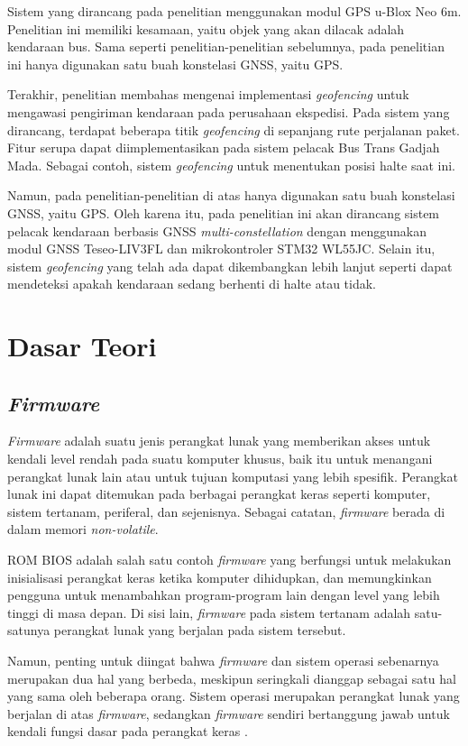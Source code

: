Sistem yang dirancang pada penelitian \cite{Widya2016} menggunakan modul GPS u-Blox Neo 6m. Penelitian ini memiliki kesamaan, yaitu objek yang akan dilacak adalah kendaraan bus. Sama seperti penelitian-penelitian sebelumnya, pada penelitian ini hanya digunakan satu buah konstelasi GNSS, yaitu GPS.

Terakhir, penelitian \cite{Priono2017} membahas mengenai implementasi \textit{geofencing} untuk mengawasi pengiriman kendaraan pada perusahaan ekspedisi. Pada sistem yang dirancang, terdapat beberapa titik \textit{geofencing} di sepanjang rute perjalanan paket. Fitur serupa dapat diimplementasikan pada sistem pelacak Bus Trans Gadjah Mada. Sebagai contoh, sistem \textit{geofencing} untuk menentukan posisi halte saat ini.

Namun, pada penelitian-penelitian di atas hanya digunakan satu buah konstelasi GNSS, yaitu GPS. Oleh karena itu, pada penelitian ini akan dirancang sistem pelacak kendaraan berbasis GNSS \textit{multi-constellation} dengan menggunakan modul GNSS Teseo-LIV3FL dan mikrokontroler STM32 WL55JC. Selain itu, sistem \textit{geofencing} yang telah ada dapat dikembangkan lebih lanjut seperti dapat mendeteksi apakah kendaraan sedang berhenti di halte atau tidak.

\section{Dasar Teori}
\subsection{\textit{Firmware}}
\textit{Firmware} adalah suatu jenis perangkat lunak yang memberikan akses untuk kendali level rendah pada suatu komputer khusus, baik itu untuk menangani perangkat lunak lain atau untuk tujuan komputasi yang lebih spesifik. Perangkat lunak ini dapat ditemukan pada berbagai perangkat keras seperti komputer, sistem tertanam, periferal, dan sejenisnya. Sebagai catatan, \textit{firmware} berada di dalam memori \textit{non-volatile}.

ROM BIOS adalah salah satu contoh \textit{firmware} yang berfungsi untuk melakukan inisialisasi perangkat keras ketika komputer dihidupkan, dan memungkinkan pengguna untuk menambahkan program-program lain dengan level yang lebih tinggi di masa depan. Di sisi lain, \textit{firmware} pada sistem tertanam adalah satu-satunya perangkat lunak yang berjalan pada sistem tersebut.

Namun, penting untuk diingat bahwa \textit{firmware} dan sistem operasi sebenarnya merupakan dua hal yang berbeda, meskipun seringkali dianggap sebagai satu hal yang sama oleh beberapa orang. Sistem operasi merupakan perangkat lunak yang berjalan di atas \textit{firmware}, sedangkan \textit{firmware} sendiri bertanggung jawab untuk kendali fungsi dasar pada perangkat keras \cite{Davidson1978}.


